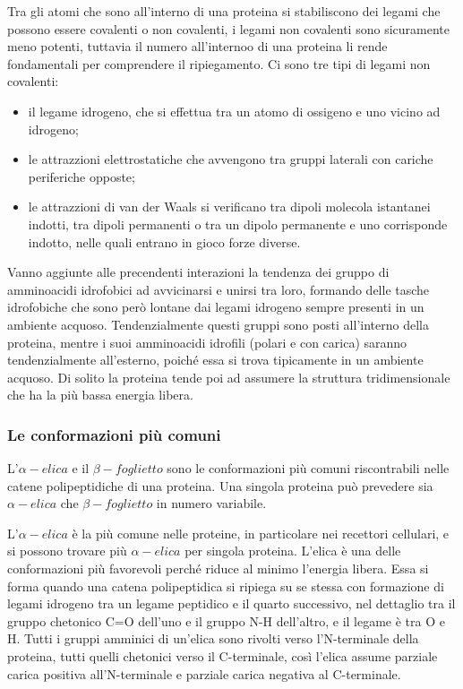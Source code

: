 Tra gli atomi che sono all'interno di una proteina si stabiliscono dei legami che possono essere covalenti o non covalenti, i legami non covalenti sono sicuramente 
meno potenti, tuttavia il numero all'internoo di una proteina li rende fondamentali per comprendere il ripiegamento. Ci sono tre tipi di legami non covalenti:
\vspace{10pt}
\begin{itemize}
    \item il legame idrogeno, che si effettua tra un atomo di ossigeno e uno vicino ad idrogeno;
    \vspace{5pt}
    \item le attrazzioni elettrostatiche che avvengono tra gruppi laterali con cariche periferiche opposte;
    \vspace{5pt}
    \item le attrazzioni di van der Waals si verificano tra dipoli molecola istantanei indotti, tra dipoli permanenti o tra un dipolo permanente e uno corrisponde 
    indotto, nelle quali entrano in gioco forze diverse.
\end{itemize} 

Vanno aggiunte alle precendenti interazioni la tendenza dei gruppo di amminoacidi idrofobici ad avvicinarsi e unirsi tra loro, formando delle tasche idrofobiche che
sono però lontane dai legami idrogeno sempre presenti in un ambiente acquoso. Tendenzialmente questi gruppi sono posti all'interno della proteina, mentre i suoi 
amminoacidi idrofili (polari e con carica) saranno tendenzialmente all'esterno, poiché essa si trova tipicamente in un ambiente acquoso. Di solito la proteina 
tende poi ad assumere la struttura tridimensionale che ha la più bassa energia libera.

\subsubsection{Le conformazioni più comuni}\label{subsec:es_subsec}
L'$\alpha-elica$ e il $\beta-foglietto$ sono le conformazioni più comuni riscontrabili nelle catene polipeptidiche di una proteina. Una singola proteina può 
prevedere sia $\alpha-elica$ che $\beta-foglietto$ in numero variabile.

L'$\alpha-elica$ è la più comune nelle proteine, in particolare nei recettori cellulari, e si possono trovare più $\alpha-elica$ per singola proteina. L'elica è 
una delle conformazioni più favorevoli perché riduce al minimo l'energia libera. Essa si forma quando una catena polipeptidica si ripiega su se stessa con formazione
di legami idrogeno tra un legame peptidico e il quarto successivo, nel dettaglio tra il gruppo chetonico C=O dell'uno e il gruppo N-H dell'altro, e il legame 
è tra O e H. Tutti i gruppi amminici di un'elica sono rivolti verso l'N-terminale della proteina, tutti quelli chetonici verso il C-terminale, così l'elica assume 
parziale carica positiva all'N-terminale e parziale carica negativa al C-terminale.

